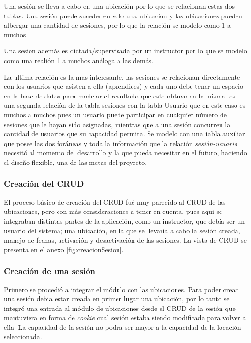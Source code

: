 Una sesión se lleva a cabo en una ubicación por lo que se relacionan estas dos tablas. Una sesión puede suceder en solo una ubicación y las ubicaciones pueden albergar una cantidad de sesiones, por lo que la relación se modelo como 1 a muchos

Una sesión además es dictada/supervisada por un instructor por lo que se modelo como una realión 1 a muchos análoga a las demás.

La ultima relación es la mas interesante, las sesiones se relacionan directamente con los usuarios que asisten a ella (aprendices) y cada uno debe tener un espacio en la base de datos para modelar el resultado que este obtuvo en la misma. es una segunda relación de la tabla sesiones con la tabla Usuario que en este caso es muchos a muchos pues un usuario puede participar en cualquier número de sesiones que le hayan sido asignadas, mientras que a una sesión concurren la cantidad de usuarios que su capacidad permita. Se modelo con una tabla auxiliar que posee las dos foráneas y toda la información que la relación \emph{sesión-usuario} necesitó al momento del desarrollo y la que pueda necesitar en el futuro, haciendo el diseño flexible, una de las metas del proyecto.

\subsubsection{Creación del CRUD}

El proceso básico de creación del CRUD fué muy parecido al CRUD de las ubicaciones, pero con más consideraciones a tener en cuenta, pues aqui se integraban distintas partes de la aplicación, como un instructor, que debía ser un usuario del sistema; una ubicación, en la que se llevaría a cabo la sesión creada, manejo de fechas, activación y desactivación de las sesiones. La vista de CRUD se presenta en el anexo \ref{fig:creacionSesion}.

\subsubsection{Creación de una sesión}

Primero se procedió a integrar el módulo con las ubicaciones. Para poder crear una sesión debia estar creada en primer lugar una ubicación, por lo tanto se integró una entrada al módulo de ubicaciones desde el CRUD de la sesión que mantuviera en forma de \emph{cookie} cual sesión estaba siendo modificada para volver a ella. La capacidad de la sesión no podra ser mayor a la capacidad de la locación seleccionada.

